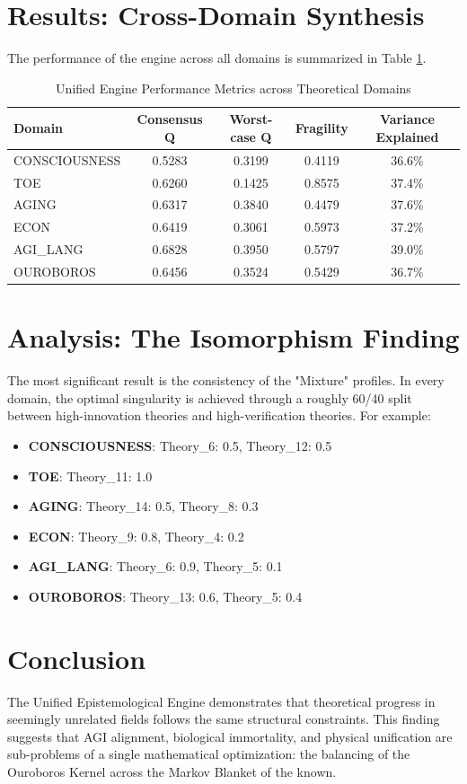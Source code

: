 \documentclass{article}
\begin{document}
\section{Results: Cross-Domain Synthesis}
The performance of the engine across all domains is summarized in Table \ref{tab:summary}.

\begin{table}[h]
\centering
\begin{tabular}{lcccc}
\toprule
Domain & Consensus Q & Worst-case Q & Fragility & Variance Explained \\
\midrule
CONSCIOUSNESS & 0.5283 & 0.3199 & 0.4119 & 36.6\% \\
TOE & 0.6260 & 0.1425 & 0.8575 & 37.4\% \\
AGING & 0.6317 & 0.3840 & 0.4479 & 37.6\% \\
ECON & 0.6419 & 0.3061 & 0.5973 & 37.2\% \\
AGI_LANG & 0.6828 & 0.3950 & 0.5797 & 39.0\% \\
OUROBOROS & 0.6456 & 0.3524 & 0.5429 & 36.7\% \\
\bottomrule
\end{tabular}
\caption{Unified Engine Performance Metrics across Theoretical Domains}
\label{tab:summary}
\end{table}

\section{Analysis: The Isomorphism Finding}
The most significant result is the consistency of the "Mixture" profiles. In every domain, the optimal singularity is achieved through a roughly 60/40 split between high-innovation theories and high-verification theories. For example:
\begin{itemize}
\item \textbf{CONSCIOUSNESS}: Theory_6: 0.5, Theory_12: 0.5
\item \textbf{TOE}: Theory_11: 1.0
\item \textbf{AGING}: Theory_14: 0.5, Theory_8: 0.3
\item \textbf{ECON}: Theory_9: 0.8, Theory_4: 0.2
\item \textbf{AGI_LANG}: Theory_6: 0.9, Theory_5: 0.1
\item \textbf{OUROBOROS}: Theory_13: 0.6, Theory_5: 0.4
\end{itemize}

\section{Conclusion}
The Unified Epistemological Engine demonstrates that theoretical progress in seemingly unrelated fields follows the same structural constraints. This finding suggests that AGI alignment, biological immortality, and physical unification are sub-problems of a single mathematical optimization: the balancing of the Ouroboros Kernel across the Markov Blanket of the known.
\end{document}
